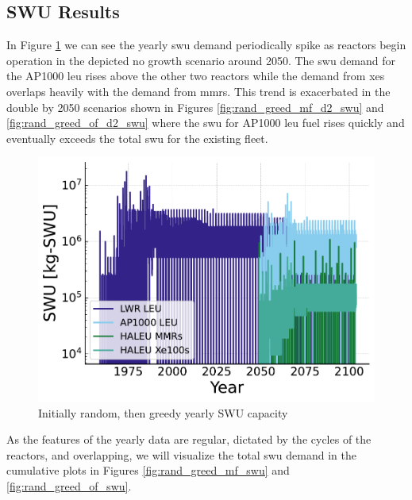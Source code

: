 \subsection{SWU Results}
\label{sec:rand_greed_swu}

In Figure \ref{fig:swu_yearly_rand_greed} we can see the yearly \gls{swu} demand periodically spike as reactors begin operation in the depicted no growth scenario around 2050. The \gls{swu} demand for the AP1000 \gls{leu} rises above the other two reactors while the demand from \glspl{xe} overlaps heavily with the demand from \glspl{mmr}. This trend is exacerbated in the double by 2050 scenarios shown in Figures \ref{fig:rand_greed_mf_d2_swu} and \ref{fig:rand_greed_of_d2_swu} where the \gls{swu} for AP1000 \gls{leu} fuel rises quickly and eventually exceeds the total \gls{swu} for the existing fleet.

\begin{figure}[H]
    \centering
    \includegraphics[scale=0.7]{images/results/swu/multi_drgng_swu_by_fuel.pdf}
    \caption{Initially random, then greedy yearly SWU capacity}
    \label{fig:swu_yearly_rand_greed}
\end{figure}

As the features of the yearly data are regular, dictated by the cycles of the
reactors, and overlapping, we will visualize the total \gls{swu} demand in the
cumulative plots in Figures \ref{fig:rand_greed_mf_swu} and \ref{fig:rand_greed_of_swu}.


